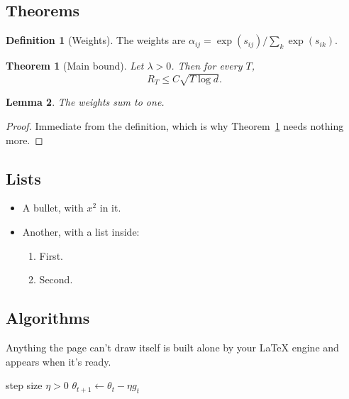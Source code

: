 \documentclass[11pt]{article}
\newtheorem{theorem}{Theorem}
\newtheorem{lemma}[theorem]{Lemma}
\theoremstyle{definition}
\newtheorem{definition}{Definition}
\begin{document}
\subsection{Theorems}

\begin{definition}[Weights]
The weights are $\alpha_{ij} = \exp(s_{ij}) / \sum_k \exp(s_{ik})$.
\end{definition}

\begin{theorem}[Main bound]\label{thm:main}
Let $\lambda > 0$. Then for every $T$,
\begin{equation}\label{eq:bound}
  R_T \le C \sqrt{T \log d}.
\end{equation}
\end{theorem}

\begin{lemma}\label{lem:sum}
The weights sum to one.
\end{lemma}

\begin{proof}
Immediate from the definition, which is why Theorem~\ref{thm:main} needs nothing more.
\end{proof}

\subsection{Lists}

\begin{itemize}
  \item A bullet, with $x^2$ in it.
  \item Another, with a list inside:
  \begin{enumerate}
    \item First.
    \item Second.
  \end{enumerate}
\end{itemize}

\subsection{Algorithms}

Anything the page can't draw itself is built alone by your LaTeX engine and appears when it's ready.

\begin{algorithm}[h]
\caption{Gradient descent}\label{alg:descent}
\begin{algorithmic}[1]
\Require step size $\eta > 0$
  \State $\theta_{t+1} \gets \theta_t - \eta g_t$
\EndFor
\end{algorithmic}
\end{algorithm}
\end{document}
